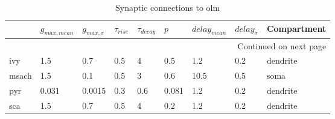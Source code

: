 \begin{longtable}{lllllllll}
\caption{Synaptic connections to olm}\label{olm_synapses}\\
\toprule
{} &   $g_{max, mean}$ & $g_{max, \sigma}$ & $\tau_{rise}$ & $\tau_{decay}$ &   $p$ & $delay_{mean}$ & $delay_{\sigma}$ & Compartment \\
\midrule
\endhead
\midrule
\multicolumn{9}{r}{{Continued on next page}} \\
\midrule
\endfoot

\bottomrule
\endlastfoot
ivy   &    1.5 &      0.7 &      0.5 &         4 &    0.5 &   1.2 &       0.2 &      dendrite\ \\
msach &    1.5 &      0.1 &      0.5 &         3 &    0.6 &  10.5 &       0.5 &               soma \\
pyr   &  0.031 &   0.0015 &      0.3 &       0.6 &  0.081 &   1.2 &       0.2 &      dendrite\ \\
sca   &    1.5 &      0.7 &      0.5 &         4 &    0.2 &   1.2 &       0.2 &      dendrite\ \\
\end{longtable}
